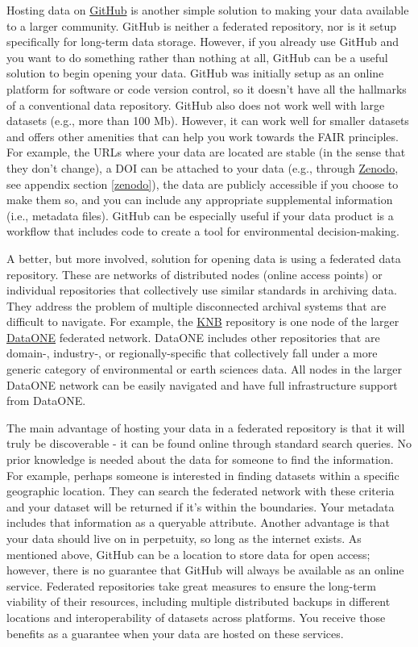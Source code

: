 \documentclass[
]{book}
\begin{document}
Hosting data on \href{https://github.com/}{GitHub} is another simple solution to making your data available to a larger community. GitHub is neither a federated repository, nor is it setup specifically for long-term data storage. However, if you already use GitHub and you want to do something rather than nothing at all, GitHub can be a useful solution to begin opening your data. GitHub was initially setup as an online platform for software or code version control, so it doesn't have all the hallmarks of a conventional data repository. GitHub also does not work well with large datasets (e.g., more than 100 Mb). However, it can work well for smaller datasets and offers other amenities that can help you work towards the FAIR principles. For example, the URLs where your data are located are stable (in the sense that they don't change), a DOI can be attached to your data (e.g., through \href{https://zenodo.org/}{Zenodo}, see appendix section \ref{zenodo}), the data are publicly accessible if you choose to make them so, and you can include any appropriate supplemental information (i.e., metadata files). GitHub can be especially useful if your data product is a workflow that includes code to create a tool for environmental decision-making.

A better, but more involved, solution for opening data is using a federated data repository. These are networks of distributed nodes (online access points) or individual repositories that collectively use similar standards in archiving data. They address the problem of multiple disconnected archival systems that are difficult to navigate. For example, the \href{https://knb.ecoinformatics.org/}{KNB} repository is one node of the larger \href{https://www.dataone.org/}{DataONE} federated network. DataONE includes other repositories that are domain-, industry-, or regionally-specific that collectively fall under a more generic category of environmental or earth sciences data. All nodes in the larger DataONE network can be easily navigated and have full infrastructure support from DataONE.

The main advantage of hosting your data in a federated repository is that it will truly be discoverable - it can be found online through standard search queries. No prior knowledge is needed about the data for someone to find the information. For example, perhaps someone is interested in finding datasets within a specific geographic location. They can search the federated network with these criteria and your dataset will be returned if it's within the boundaries. Your metadata includes that information as a queryable attribute. Another advantage is that your data should live on in perpetuity, so long as the internet exists. As mentioned above, GitHub can be a location to store data for open access; however, there is no guarantee that GitHub will always be available as an online service. Federated repositories take great measures to ensure the long-term viability of their resources, including multiple distributed backups in different locations and interoperability of datasets across platforms. You receive those benefits as a guarantee when your data are hosted on these services.
\end{document}
